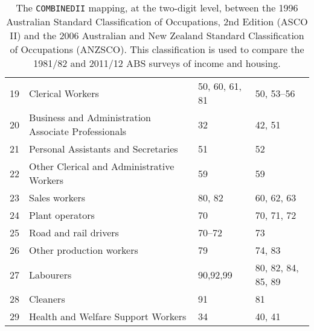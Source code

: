 \begin{sidewaystable}[ht]
\begin{tabular}{clll}
  19 & Clerical Workers & 50, 60, 61, 81 & 50, 53--56 \\ 
  20 & Business and Administration Associate Professionals & 32 & 42, 51 \\ 
  21 & Personal Assistants and Secretaries & 51 & 52 \\ 
  22 & Other Clerical and Administrative Workers & 59 & 59 \\ 
  23 & Sales workers & 80, 82 & 60, 62, 63 \\ 
  24 & Plant operators & 70 & 70, 71, 72 \\ 
  25 & Road and rail drivers & 70--72 & 73 \\ 
  26 & Other production workers & 79 & 74, 83 \\ 
  27 & Labourers & 90,92,99 & 80, 82, 84, 85, 89 \\ 
  28 & Cleaners & 91 & 81 \\ 
  29 & Health and Welfare Support Workers & 34 & 40, 41 \\ 
   \hline
\end{tabular}
\caption{The {\tt COMBINEDII} mapping, at the two-digit level, between the 1996 Australian Standard Classification of Occupations, 2nd Edition (ASCO II) and the 2006 Australian and New Zealand Standard Classification of Occupations (ANZSCO). This classification is used to compare the 1981/82 and 2011/12 ABS surveys of income and housing.}
\label{tab:combined2}
\end{sidewaystable}

